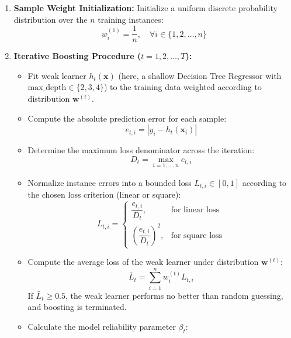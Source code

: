 \documentclass[12pt,a4paper]{article}
\begin{document}
\begin{enumerate}
    \item \textbf{Sample Weight Initialization:} Initialize a uniform discrete probability distribution over the $n$ training instances:
    \begin{equation}
        w_i^{(1)} = \frac{1}{n}, \quad \forall i \in \{1, 2, \dots, n\}
    \end{equation}
    
    \item \textbf{Iterative Boosting Procedure ($t = 1, 2, \dots, T$):}
    \begin{itemize}
        \item Fit weak learner $h_t(\mathbf{x})$ (here, a shallow Decision Tree Regressor with $\text{max\_depth} \in \{2, 3, 4\}$) to the training data weighted according to distribution $\mathbf{w}^{(t)}$.
        \item Compute the absolute prediction error for each sample:
        \begin{equation}
            e_{t,i} = \left| y_i - h_t(\mathbf{x}_i) \right|
        \end{equation}
        \item Determine the maximum loss denominator across the iteration:
        \begin{equation}
            D_t = \max_{i=1,\dots,n} e_{t,i}
        \end{equation}
        \item Normalize instance errors into a bounded loss $L_{t,i} \in [0, 1]$ according to the chosen loss criterion (linear or square):
        \begin{equation}
            L_{t,i} = \begin{cases}
                \dfrac{e_{t,i}}{D_t}, & \text{for linear loss} \\[0.25cm]
                \left( \dfrac{e_{t,i}}{D_t} \right)^2, & \text{for square loss}
            \end{cases}
        \end{equation}
        \item Compute the average loss of the weak learner under distribution $\mathbf{w}^{(t)}$:
        \begin{equation}
            \bar{L}_t = \sum_{i=1}^n w_i^{(t)} L_{t,i}
        \end{equation}
        If $\bar{L}_t \ge 0.5$, the weak learner performs no better than random guessing, and boosting is terminated.
        \item Calculate the model reliability parameter $\beta_t$:

\end{itemize}
\end{enumerate}
\end{document}
